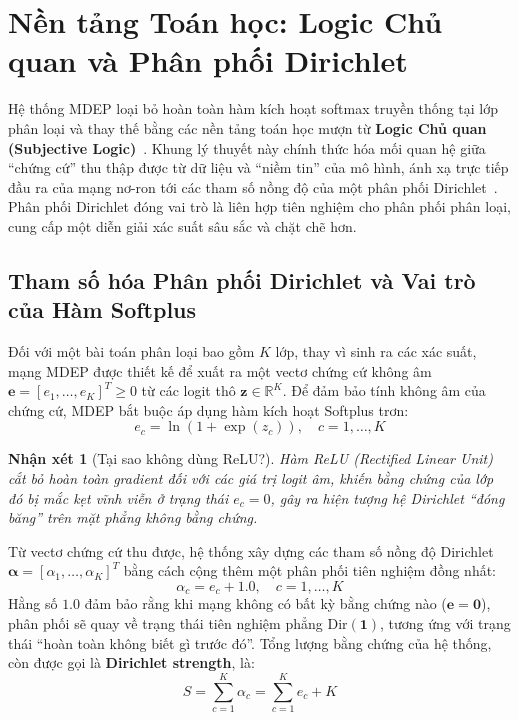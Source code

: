 \documentclass[11pt, a4paper]{article}
\newcommand{\Dir}{\text{Dir}}
\newcommand{\R}{\mathbb{R}}
\newtheorem{remark}{Nhận xét}
\begin{document}
\section{Nền tảng Toán học: Logic Chủ quan và Phân phối Dirichlet}\label{sec:math}

Hệ thống MDEP loại bỏ hoàn toàn hàm kích hoạt softmax truyền thống tại lớp phân loại và thay thế bằng các nền tảng toán học mượn từ \textbf{Logic Chủ quan (Subjective Logic)}~\cite{josang2016subjective}. Khung lý thuyết này chính thức hóa mối quan hệ giữa ``chứng cứ'' thu thập được từ dữ liệu và ``niềm tin'' của mô hình, ánh xạ trực tiếp đầu ra của mạng nơ-ron tới các tham số nồng độ của một phân phối Dirichlet~\cite{sensoy2018evidential}. Phân phối Dirichlet đóng vai trò là liên hợp tiên nghiệm cho phân phối phân loại, cung cấp một diễn giải xác suất sâu sắc và chặt chẽ hơn.

\subsection{Tham số hóa Phân phối Dirichlet và Vai trò của Hàm Softplus}

Đối với một bài toán phân loại bao gồm $K$ lớp, thay vì sinh ra các xác suất, mạng MDEP được thiết kế để xuất ra một vectơ chứng cứ không âm $\bm{e} = [e_1, \ldots, e_K]^T \ge 0$ từ các logit thô $\bm{z} \in \R^K$. Để đảm bảo tính không âm của chứng cứ, MDEP bắt buộc áp dụng hàm kích hoạt Softplus trơn:
\begin{equation}\label{eq:softplus}
    e_c = \ln(1 + \exp(z_c)), \quad c = 1, \ldots, K
\end{equation}

\begin{remark}[Tại sao không dùng ReLU?]
Hàm ReLU (Rectified Linear Unit) cắt bỏ hoàn toàn gradient đối với các giá trị logit âm, khiến bằng chứng của lớp đó bị mắc kẹt vĩnh viễn ở trạng thái $e_c = 0$, gây ra hiện tượng hệ Dirichlet ``đóng băng'' trên mặt phẳng không bằng chứng.
\end{remark}

Từ vectơ chứng cứ thu được, hệ thống xây dựng các tham số nồng độ Dirichlet $\bm{\alpha} = [\alpha_1, \ldots, \alpha_K]^T$ bằng cách cộng thêm một phân phối tiên nghiệm đồng nhất:
\begin{equation}\label{eq:alpha}
    \alpha_c = e_c + 1.0, \quad c = 1, \ldots, K
\end{equation}
Hằng số $1.0$ đảm bảo rằng khi mạng không có bất kỳ bằng chứng nào ($\bm{e} = \bm{0}$), phân phối sẽ quay về trạng thái tiên nghiệm phẳng $\Dir(\bm{1})$, tương ứng với trạng thái ``hoàn toàn không biết gì trước đó''. Tổng lượng bằng chứng của hệ thống, còn được gọi là \textbf{Dirichlet strength}, là:
\begin{equation}\label{eq:S}
    S = \sum_{c=1}^K \alpha_c = \sum_{c=1}^K e_c + K
\end{equation}
\end{document}
